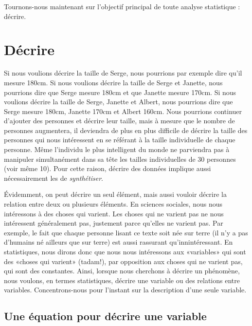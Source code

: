 \documentclass[
]{book}
\begin{document}
Tournons-nous maintenant sur l'objectif principal de toute analyse statistique : décrire.

\hypertarget{duxe9crire}{%
\chapter{Décrire}\label{duxe9crire}}

Si nous voulions décrire la taille de Serge, nous pourrions par exemple dire qu'il mesure 180cm. Si nous voulions décrire la taille de Serge et Janette, nous pourrions dire que Serge mesure 180cm et que Janette mesure 170cm. Si nous voulions décrire la taille de Serge, Janette et Albert, nous pourrions dire que Serge mesure 180cm, Janette 170cm et Albert 160cm. Nous pourrions continuer d'ajouter des personnes et décrire leur taille, mais à mesure que le nombre de personnes augmentera, il deviendra de plus en plus difficile de décrire la taille des personnes qui nous intéressent en se référant à la taille individuelle de chaque personne. Même l'individu le plus intelligent du monde ne parviendra pas à manipuler simultanément dans sa tête les tailles individuelles de 30 personnes (voir même 10). Pour cette raison, décrire des données implique aussi nécessairement les de \emph{synthétiser}.

Évidemment, on peut décrire un seul élément, mais aussi vouloir décrire la relation entre deux ou plusieurs éléments. En sciences sociales, nous nous intéressons à des choses qui varient. Les choses qui ne varient pas ne nous intéressent généralement pas, justement parce qu'elles ne varient pas. Par exemple, le fait que chaque personne lisant ce texte soit née sur terre (il n'y a pas d'humains né ailleurs que sur terre) est aussi rassurant qu'innintéressant. En statistiques, nous dirons donc que nous nous intéressons aux «variables» qui sont des «choses qui varient» (tadam!), par opposition aux choses qui ne varient pas, qui sont des constantes. Ainsi, lorsque nous cherchons à décrire un phénomène, nous voulons, en termes statistiques, décrire une variable ou des relations entre variables. Concentrons-nous pour l'instant sur la description d'une seule variable.

\hypertarget{une-uxe9quation-pour-duxe9crire-une-variable}{%
\section{Une équation pour décrire une variable}\label{une-uxe9quation-pour-duxe9crire-une-variable}}
\end{document}
